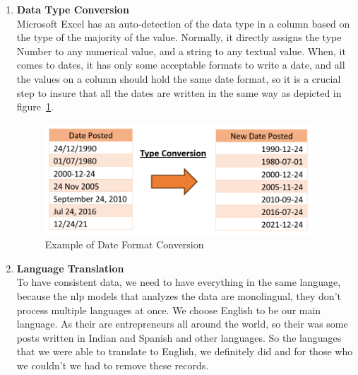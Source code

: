\begin{enumerate}
\item \textbf{Data Type Conversion}\\
Microsoft Excel has an auto-detection of the data type in a column based on the type of the majority of the value. Normally, it directly assigns the type Number to any numerical value, and a string to any textual value. When, it comes to dates, it has only some acceptable formats to write a date, and all the values on a column should hold the same date format, so it is a crucial step to insure that all the dates are written in the same way as depicted in figure~\ref{fig:dateConversion}.
\begin{figure}[H]
\centering
\includegraphics[width=10cm]{dateConversion}
\caption{Example of Date Format Conversion}
\label{fig:dateConversion}
\end{figure}

\item \textbf{Language Translation}\\
To have consistent data, we need to have everything in the same language, because the \ac{nlp} models that analyzes the data are monolingual, they don't process multiple languages at once. We choose English to be our main language. As their are entrepreneurs all around the world, so their was some posts written in Indian and Spanish and other languages. So the languages that we were able to translate to English, we definitely did and for those who we couldn't we had to remove these records.


\end{enumerate}
